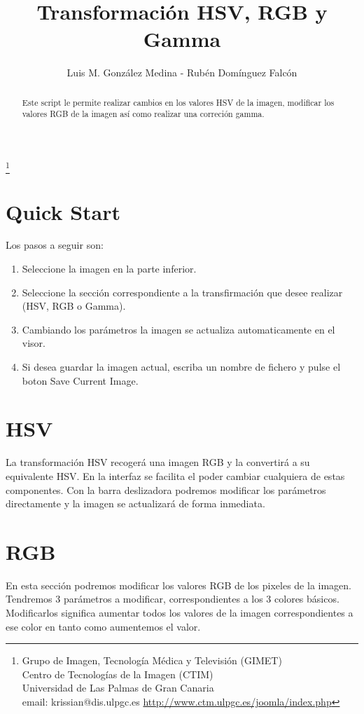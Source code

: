 \documentclass{article}
\begin{document}
\title{Transformaci\'on HSV, RGB y Gamma}
\author{Luis M. Gonz\'alez Medina -  Rub\'en Dom\'inguez Falc\'on
}
\thanks{
Grupo de Imagen, Tecnolog\'ia M\'edica y Televisi\'on (GIMET)\\
Centro de Tecnolog\'ias de la Imagen (CTIM)\\
Universidad de Las Palmas de Gran Canaria\\
email: krissian@dis.ulpgc.es
\url{http://www.ctm.ulpgc.es/joomla/index.php}
}


\maketitle

\begin{abstract}
Este script le permite realizar cambios en los valores HSV de la imagen, modificar los valores RGB de la imagen as\'i como realizar una correci\'on gamma.
\end{abstract}


\section{Quick Start}

Los pasos a seguir son:
\begin{enumerate}
  \item Seleccione la imagen en la parte inferior.
  \item Seleccione la secci\'on correspondiente a la transfirmaci\'on que desee realizar (HSV, RGB o Gamma).
  \item Cambiando los par\'ametros la imagen se actualiza automaticamente en el visor.
  \item Si desea guardar la imagen actual, escriba un nombre de fichero y pulse el boton Save Current Image.
\end{enumerate}

\section{HSV}
La transformaci\'on HSV recoger\'a una imagen RGB y la convertir\'a a su equivalente HSV. En la interfaz se facilita el poder cambiar cualquiera de estas componentes. Con la barra deslizadora podremos modificar los par\'ametros directamente y la imagen se actualizar\'a de forma inmediata.

\section{RGB}
En esta secci\'on podremos modificar los valores RGB de los pixeles de la imagen. Tendremos 3 par\'ametros a modificar, correspondientes a los 3 colores b\'asicos. Modificarlos significa aumentar todos los valores de la imagen correspondientes a ese color en tanto como aumentemos el valor.
\end{document}
